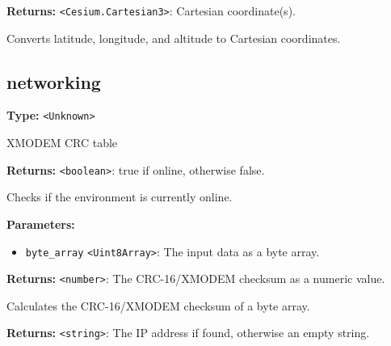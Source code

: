 \documentclass[12pt,a4paper]{article}
\begin{document}
\noindent \textbf{Returns:} \texttt{<Cesium.Cartesian3>}: Cartesian coordinate(s).

\noindent Converts latitude, longitude, and altitude to Cartesian coordinates.


\subsection{networking}
\vspace{5mm}
\noindent {}\vspace{4mm}


\noindent \textbf{Type:} \texttt{<Unknown>}

\noindent XMODEM CRC table

\vspace{5mm}
\noindent {}


\noindent \textbf{Returns:} \texttt{<boolean>}: \textasciigrave{}true\textasciigrave{} if online, otherwise \textasciigrave{}false\textasciigrave{}.

\noindent Checks if the environment is currently online.

\vspace{5mm}
\noindent {}


\noindent \textbf{Parameters:}
\begin{itemize}
  \item \texttt{byte\_array} \texttt{<Uint8Array>}: The input data as a byte array.
\end{itemize}

\noindent \textbf{Returns:} \texttt{<number>}: The CRC-16/XMODEM checksum as a numeric value.

\noindent Calculates the CRC-16/XMODEM checksum of a byte array.

\vspace{5mm}
\noindent {}


\noindent \textbf{Returns:} \texttt{<string>}: The IP address if found, otherwise an empty string.
\end{document}
